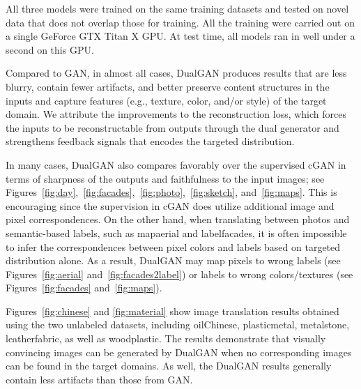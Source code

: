 All three models were trained on the same training datasets and tested on novel data that does not overlap those for training.
All the training were carried out on a single GeForce GTX Titan X GPU. At test time, all models ran in well under a second 
on this GPU. 

Compared to GAN, in almost all cases, DualGAN produces results that are less blurry, contain fewer artifacts, and better
preserve content structures in the inputs and capture features (e.g., texture, color, and/or style) of the target domain. 
We attribute the improvements to the reconstruction loss, which forces the inputs to be reconstructable from 
outputs through the dual generator and strengthens feedback signals that encodes the targeted distribution.  

In many cases, DualGAN also compares favorably over the supervised cGAN in terms of sharpness of the outputs and 
faithfulness to the input images; see Figures~\ref{fig:day},~\ref{fig:facades},~\ref{fig:photo},~\ref{fig:sketch}, and~\ref{fig:maps}.
This is encouraging since the supervision in cGAN does utilize additional image and pixel correspondences. On the other hand, 
when translating between photos and semantic-based labels, such as mapaerial and labelfacades, 
it is often impossible to infer the correspondences between pixel colors and labels based on targeted distribution alone. As a result, 
DualGAN may map pixels to wrong labels (see Figures~\ref{fig:aerial} and~\ref{fig:facades2label}) or labels to wrong colors/textures 
(see Figures~\ref{fig:facades} and~\ref{fig:maps}).

Figures~\ref{fig:chinese} and \ref{fig:material} show image translation results obtained using the two unlabeled datasets, including 
oilChinese, plasticmetal, metalstone, leatherfabric, as well as woodplastic. 
The results demonstrate that visually convincing images can be generated by DualGAN when no corresponding images can be found in 
the target domains. As well, the DualGAN results generally contain less artifacts than those from GAN.




